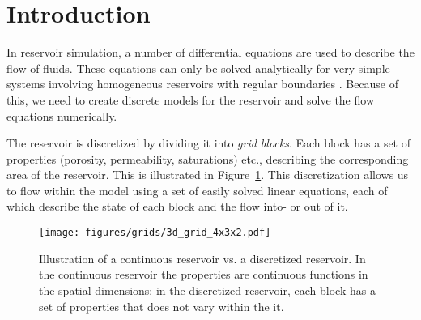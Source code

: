 
\section{Introduction} %
\label{sec:introduction}
In reservoir simulation, a number of differential equations are used to describe the flow of fluids. These equations can only be solved analytically for very simple systems involving homogeneous reservoirs with regular boundaries \cite{Peaceman1977Fundamentals}. Because of this, we need to create discrete models for the reservoir and solve the flow equations numerically.

The reservoir is discretized by dividing it into \emph{grid blocks}. Each block has a set of properties (porosity, permeability, saturations) etc., describing the corresponding area of the reservoir. This is illustrated in Figure~\ref{fig:grid-discretization}. This discretization allows us to flow within the model using a set of easily solved linear equations, each of which describe the state of each block and the flow into- or out of it.

\begin{figure}[htbp]
    \centering
    \texttt{[image: figures/grids/3d\_grid\_4x3x2.pdf]}
    \caption{Illustration of a continuous reservoir vs. a discretized reservoir. In the continuous reservoir the properties are continuous functions in the spatial dimensions; in the discretized reservoir, each block has a set of properties that does not vary within the it.}
    \label{fig:grid-discretization}
\end{figure}

